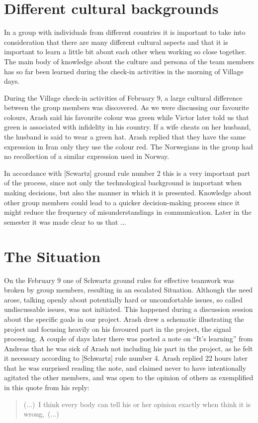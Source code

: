 \section{Different cultural backgrounds}
In a group with individuals from different countries it is important to take into consideration that there are many different cultural aspects and that it is important to learn a little bit about each other when working so close together.
The main body of knowledge about the culture and persona of the team members has so far been learned during the check-in activities in the morning of Village days.

During the Village check-in activities of February 9, a large cultural difference between the group members was discovered.
As we were discussing our favourite colours,
Arash said his favourite colour was green while Victor later told us that green is associated with infidelity in his country.
If a wife cheats on her husband, the husband is said to wear a green hat.
Arash replied that they have the same expression in Iran only they use the colour red.
The Norwegians in the group had no recollection of a similar expression used in Norway.

In accordance with [Scwartz] ground rule number 2 this is a very important part of the process, since not only the technological background is important when making decisions, but also the manner in which it is presented.
Knowledge about other group members could lead to a quicker decision-making process since it might reduce the frequency of misunderstandings in communication.
Later in the semester it was made clear to us that ... %

\section{The Situation}
On the February 9 one of Schwartz ground rules for effective teamwork was broken by group members, resulting in an escalated Situation.
Although the need arose, talking openly about potentially hard or uncomfortable issues, so called undiscussable issues, was not initiated.
This happened during a discussion session about the specific goals in our project.
Arash drew a schematic illustrating the project and focusing heavily on his favoured part in the project, the signal processing.
A couple of days later there was posted a note on ``It's learning'' from Andreas that he was sick of Arash not including his part in the project, as he felt it necessary according to [Schwartz] rule number 4. %
Arash replied 22 hours later that he was surprised reading the note, and claimed never to have intentionally agitated the other members, and was open to the opinion of others as exemplified in this quote from his reply:
\begin{quote}
  (...)~I think every body can tell his or her opinion exactly when think  it is wrong,~(...)
\end{quote}

